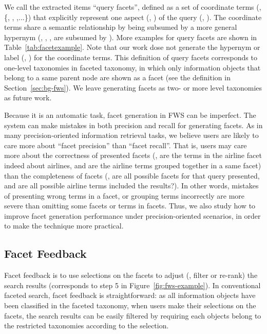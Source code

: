 We call the extracted items ``query facets'', defined as a set of coordinate terms (\eg, \{, , ,...\}) that explicitly represent one aspect (\eg, ) of the query (\eg, ). The coordinate terms share a semantic relationship by being subsumed by a more general hypernym (\eg, , ,  are subsumed by ). More examples for query facets are shown in Table~\ref{tab:facetexample}. Note that our work dose not generate the hypernym or label (\eg, ) for the coordinate terms. This definition of query facets corresponds to one-level taxonomies in faceted taxonomy, in which only information objects that belong to a same parent node are shown as a facet (see the definition in Section~\ref{sec:bg-fws}). We leave generating facets as two- or more level taxonomies as future work.

Because it is an automatic task, facet generation in FWS can be imperfect. The system can make mistakes in both precision and recall for generating facets. As in many precision-oriented information retrieval tasks, we believe users are likely to care more about ``facet precision'' than ``facet recall''. That is, users may care more about the correctness of presented facets (\eg, are the terms in the airline facet indeed about airlines, and are the airline terms grouped together in a same facet) than the completeness of facets (\eg, are all possible facets for that query presented, and are all possible airline terms included the results?). In other words, mistakes of presenting wrong terms in a facet, or grouping terms incorrectly are more severe than omitting some facets or terms in facets. Thus, we also study how to improve facet generation performance under precision-oriented scenarios, in order to make the technique more practical.

\subsection{Facet Feedback}
Facet feedback is to use selections on the facets to adjust (\eg, filter or re-rank) the search results (corresponds to step 5 in Figure~\ref{fig:fws-example}). In conventional faceted search, facet feedback is straightforward: as all information objects have been classified in the faceted taxonomy, when users make their selections on the facets, the search results can be easily filtered by requiring each objects belong to the restricted taxonomies according to the selection.

